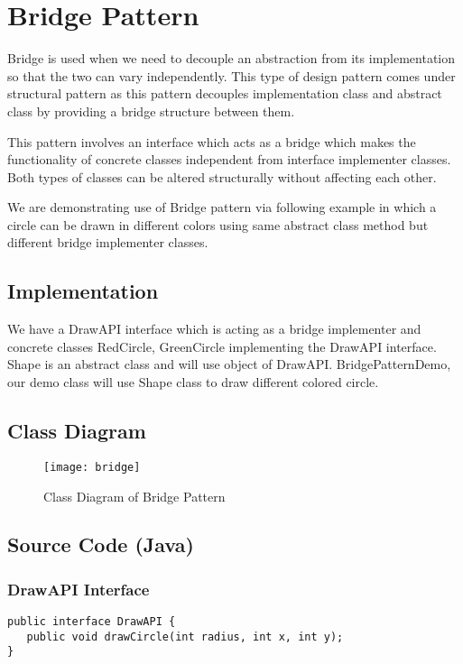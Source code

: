 \newpage
\section{Bridge Pattern}

Bridge is used when we need to decouple an abstraction from its implementation so that the two can vary independently. This type of design pattern comes under structural pattern as this pattern decouples implementation class and abstract class by providing a bridge structure between them.

This pattern involves an interface which acts as a bridge which makes the functionality of concrete classes independent from interface implementer classes. Both types of classes can be altered structurally without affecting each other.

We are demonstrating use of Bridge pattern via following example in which a circle can be drawn in different colors using same abstract class method but different bridge implementer classes. 

\subsection{Implementation}

We have a DrawAPI interface which is acting as a bridge implementer and concrete classes RedCircle, GreenCircle implementing the DrawAPI interface. Shape is an abstract class and will use object of DrawAPI. BridgePatternDemo, our demo class will use Shape class to draw different colored circle.

\subsection{Class Diagram}

\begin{figure}[h]
\centering
\texttt{[image: bridge]}
\caption{Class Diagram of Bridge Pattern}
\end{figure}

\newpage
\subsection{Source Code (Java)}

\subsubsection{DrawAPI Interface}

\begin{verbatim}
public interface DrawAPI {
   public void drawCircle(int radius, int x, int y);
}
\end{verbatim}

